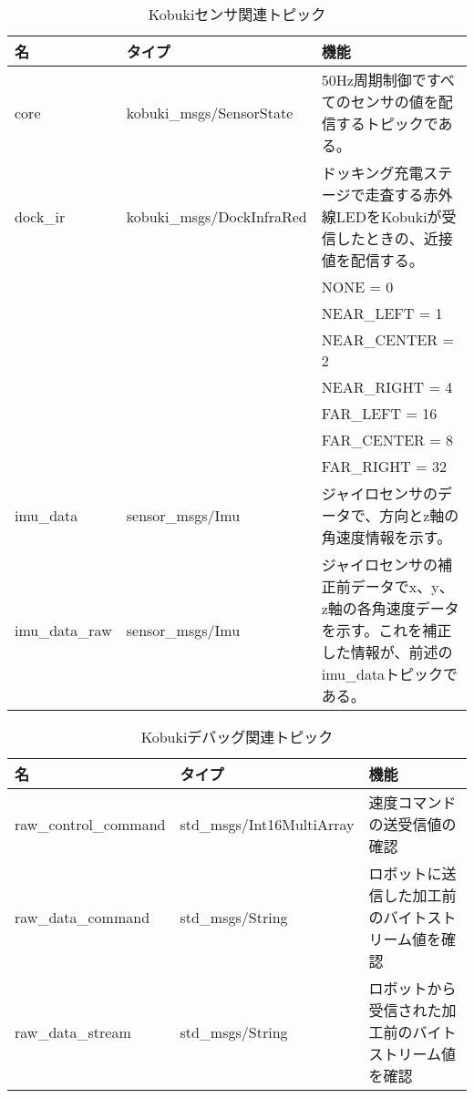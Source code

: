 \begin{itemize}
\begin{table}[htp]
\centering
\begin{tabular}{p{2cm} p{5cm} p{6cm}}
\toprule
\textbf{名} & \textbf{タイプ} & \textbf{機能}\\
\midrule
core  & kobuki\_msgs/SensorState  & 50Hz周期制御ですべてのセンサの値を配信するトピックである。 \\
dock\_ir  & kobuki\_msgs/DockInfraRed  & ドッキング充電ステージで走査する赤外線LEDをKobukiが受信したときの、近接値を配信する。\\
& & NONE = 0 \\
& & NEAR\_LEFT = 1 \\
& & NEAR\_CENTER = 2 \\
& & NEAR\_RIGHT = 4 \\
& & FAR\_LEFT = 16 \\
& & FAR\_CENTER = 8 \\
& & FAR\_RIGHT = 32 \\
imu\_data  & sensor\_msgs/Imu  & ジャイロセンサのデータで、方向とz軸の角速度情報を示す。\\
imu\_data\_raw & sensor\_msgs/Imu  & ジャイロセンサの補正前データでx、y、z軸の各角速度データを示す。これを補正した情報が、前述のimu\_dataトピックである。\\
\bottomrule
\end{tabular}
\caption{Kobukiセンサ関連トピック}
\end{table}

\begin{table}[htp]
\centering
\begin{tabular}{p{4cm} p{4cm} p{5cm}}
\toprule
\textbf{名} & \textbf{タイプ} & \textbf{機能}\\
\midrule
raw\_control\_command & std\_msgs/Int16MultiArray & 速度コマンドの送受信値の確認 \\
raw\_data\_command  & std\_msgs/String & ロボットに送信した加工前のバイトストリーム値を確認 \\
raw\_data\_stream & std\_msgs/String & ロボットから受信された加工前のバイトストリーム値を確認 \\
\bottomrule
\end{tabular}
\caption{Kobukiデバッグ関連トピック}
\end{table}


\end{itemize}
